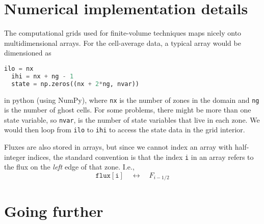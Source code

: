 \section{Numerical implementation details}

The computational grids used for finite-volume techniques maps nicely
onto multidimensional arrays.  For the cell-average data, a typical
array would be dimensioned as
\begin{lstlisting}[language=Python]
  ilo = nx
  ihi = nx + ng - 1
  state = np.zeros((nx + 2*ng, nvar))
\end{lstlisting}
in python (using NumPy), where {\tt nx} is the number of zones in the
domain and {\tt ng} is the number of ghost cells.  For some problems,
there might be more than one state variable, so {\tt nvar}, is the number
of state variables that live in each zone.  We would then loop from {\tt ilo}
to {\tt ihi} to access the state data in the grid interior.

Fluxes are also stored in arrays, but since we cannot index an array with
half-integer indices, the standard convention is that the index {\tt i} in an
array refers to the flux on the {\em left} edge of that zone.  I.e.,
\begin{equation*}
\mathtt{flux[i]} \quad \longleftrightarrow \quad F_{i-1/2}
\end{equation*}

\section{Going further}

